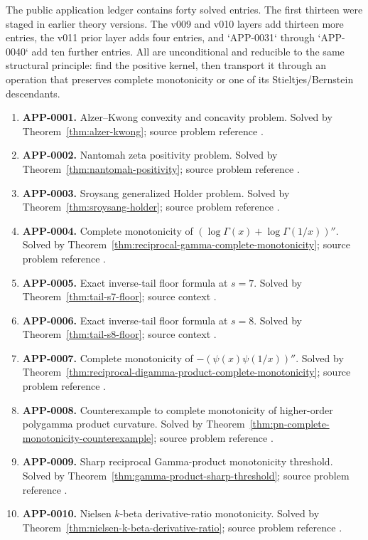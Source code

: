 \documentclass[11pt]{article}
\numberwithin{equation}{section}
\theoremstyle{definition}
\theoremstyle{remark}
\newcommand{\1}{\mathbf 1}
\begin{document}
The public application ledger contains forty solved entries.  The first
thirteen were staged in earlier theory versions.  The v009 and v010 layers add
thirteen more entries, the v011 prior layer adds four entries, and `APP-0031`
through `APP-0040` add ten further entries.  All are
unconditional and reducible to the same
structural principle:
find the positive kernel, then transport it through an operation that preserves
complete monotonicity or one of its Stieltjes/Bernstein descendants.
\begin{enumerate}
\item \textbf{APP-0001.} Alzer--Kwong convexity and concavity problem.  Solved by Theorem~\ref{thm:alzer-kwong}; source problem reference \cite{alzer-kwong}.
\item \textbf{APP-0002.} Nantomah zeta positivity problem.  Solved by Theorem~\ref{thm:nantomah-positivity}; source problem reference \cite{nantomah}.
\item \textbf{APP-0003.} Sroysang generalized Holder problem.  Solved by Theorem~\ref{thm:sroysang-holder}; source problem reference \cite{sroysang}.
\item \textbf{APP-0004.} Complete monotonicity of \((\log\Gamma(x)+\log\Gamma(1/x))''\).  Solved by Theorem~\ref{thm:reciprocal-gamma-complete-monotonicity}; source problem reference \cite{qi-lim-nantomah-polygamma}.
\item \textbf{APP-0005.} Exact inverse-tail floor formula at \(s=7\).  Solved by Theorem~\ref{thm:tail-s7-floor}; source context \cite{kim-song-tail,pan-wu-tail}.
\item \textbf{APP-0006.} Exact inverse-tail floor formula at \(s=8\).  Solved by Theorem~\ref{thm:tail-s8-floor}; source context \cite{kim-song-tail,pan-wu-tail}.
\item \textbf{APP-0007.} Complete monotonicity of \(-(\psi(x)\psi(1/x))''\).  Solved by Theorem~\ref{thm:reciprocal-digamma-product-complete-monotonicity}; source problem reference \cite{qi-lim-nantomah-polygamma}.
\item \textbf{APP-0008.} Counterexample to complete monotonicity of higher-order polygamma product curvature.  Solved by Theorem~\ref{thm:pn-complete-monotonicity-counterexample}; source problem reference \cite{qi-lim-nantomah-polygamma}.
\item \textbf{APP-0009.} Sharp reciprocal Gamma-product monotonicity threshold.  Solved by Theorem~\ref{thm:gamma-product-sharp-threshold}; source problem reference \cite{bulboaca-zayed-gamma}.
\item \textbf{APP-0010.} Nielsen \(k\)-beta derivative-ratio monotonicity.  Solved by Theorem~\ref{thm:nielsen-k-beta-derivative-ratio}; source problem reference \cite{yin-zhang-k-beta}.

\end{enumerate}
\end{document}
